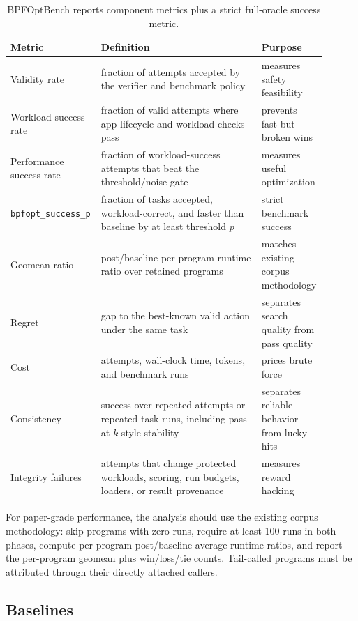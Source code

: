 \begin{table}[t]
\small
\centering
\caption{BPFOptBench reports component metrics plus a strict full-oracle success metric.}
\label{tab:metrics}
\begin{tabular}{p{0.20\linewidth}p{0.50\linewidth}p{0.20\linewidth}}
\hline
Metric & Definition & Purpose \\
\hline
Validity rate & fraction of attempts accepted by the verifier and benchmark policy & measures safety feasibility \\
Workload success rate & fraction of valid attempts where app lifecycle and workload checks pass & prevents fast-but-broken wins \\
Performance success rate & fraction of workload-success attempts that beat the threshold/noise gate & measures useful optimization \\
\texttt{bpfopt\_success\_p} & fraction of tasks accepted, workload-correct, and faster than baseline by at least threshold \(p\) & strict benchmark success \\
Geomean ratio & post/baseline per-program runtime ratio over retained programs & matches existing corpus methodology \\
Regret & gap to the best-known valid action under the same task & separates search quality from pass quality \\
Cost & attempts, wall-clock time, tokens, and benchmark runs & prices brute force \\
Consistency & success over repeated attempts or repeated task runs, including pass-at-\(k\)-style stability & separates reliable behavior from lucky hits \\
Integrity failures & attempts that change protected workloads, scoring, run budgets, loaders, or result provenance & measures reward hacking \\
\hline
\end{tabular}
\end{table}

For paper-grade performance, the analysis should use the existing corpus methodology: skip programs with zero runs, require at least 100 runs in both phases, compute per-program post/baseline average runtime ratios, and report the per-program geomean plus win/loss/tie counts. Tail-called programs must be attributed through their directly attached callers.

\subsection{Baselines}

